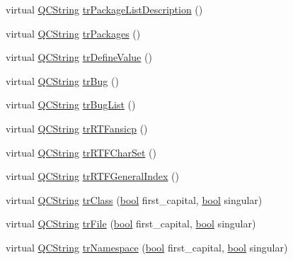 \begin{DoxyCompactItemize}
\item 
virtual \hyperlink{class_q_c_string}{Q\+C\+String} \hyperlink{class_translator_portuguese_a648632f8fd2eed89ebfb700c4d404f8a}{tr\+Package\+List\+Description} ()
\item 
virtual \hyperlink{class_q_c_string}{Q\+C\+String} \hyperlink{class_translator_portuguese_ab7d7f219b0259b7e3dd317dc997f2b61}{tr\+Packages} ()
\item 
virtual \hyperlink{class_q_c_string}{Q\+C\+String} \hyperlink{class_translator_portuguese_a8fee1ab27058583aec5d46af33a0fedc}{tr\+Define\+Value} ()
\item 
virtual \hyperlink{class_q_c_string}{Q\+C\+String} \hyperlink{class_translator_portuguese_a303704a1806264d8e02689da67dec89b}{tr\+Bug} ()
\item 
virtual \hyperlink{class_q_c_string}{Q\+C\+String} \hyperlink{class_translator_portuguese_adf2619e230b5036a337fb1e839224267}{tr\+Bug\+List} ()
\item 
virtual \hyperlink{class_q_c_string}{Q\+C\+String} \hyperlink{class_translator_portuguese_aebdebcd3a2bcbb38b22b98a7fc92af79}{tr\+R\+T\+Fansicp} ()
\item 
virtual \hyperlink{class_q_c_string}{Q\+C\+String} \hyperlink{class_translator_portuguese_a92a1e1d2fe9a64af40a2c7c65115b3ff}{tr\+R\+T\+F\+Char\+Set} ()
\item 
virtual \hyperlink{class_q_c_string}{Q\+C\+String} \hyperlink{class_translator_portuguese_a3c2b7185a3e8e2fb71458ebc8e605244}{tr\+R\+T\+F\+General\+Index} ()
\item 
virtual \hyperlink{class_q_c_string}{Q\+C\+String} \hyperlink{class_translator_portuguese_a1ddaefcba05eca18eec416694e02309b}{tr\+Class} (\hyperlink{qglobal_8h_a1062901a7428fdd9c7f180f5e01ea056}{bool} first\+\_\+capital, \hyperlink{qglobal_8h_a1062901a7428fdd9c7f180f5e01ea056}{bool} singular)
\item 
virtual \hyperlink{class_q_c_string}{Q\+C\+String} \hyperlink{class_translator_portuguese_acc79ac16678f5536de5757e5e94b1c88}{tr\+File} (\hyperlink{qglobal_8h_a1062901a7428fdd9c7f180f5e01ea056}{bool} first\+\_\+capital, \hyperlink{qglobal_8h_a1062901a7428fdd9c7f180f5e01ea056}{bool} singular)
\item 
virtual \hyperlink{class_q_c_string}{Q\+C\+String} \hyperlink{class_translator_portuguese_a9d758c550ae9d5fa29d79badcd0dab5b}{tr\+Namespace} (\hyperlink{qglobal_8h_a1062901a7428fdd9c7f180f5e01ea056}{bool} first\+\_\+capital, \hyperlink{qglobal_8h_a1062901a7428fdd9c7f180f5e01ea056}{bool} singular)
\item 

\end{DoxyCompactItemize}
